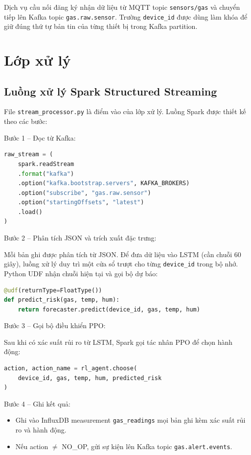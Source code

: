 Dịch vụ cầu nối đăng ký nhận dữ liệu từ MQTT topic \texttt{sensors/gas} và chuyển tiếp lên Kafka topic \texttt{gas.raw.sensor}. Trường \texttt{device\_id} được dùng làm khóa để giữ đúng thứ tự bản tin của từng thiết bị trong Kafka partition.

\section{Lớp xử lý}

\subsection{Luồng xử lý Spark Structured Streaming}

File \texttt{stream\_processor.py} là điểm vào của lớp xử lý. Luồng Spark được thiết kế theo các bước:

Bước 1 – Đọc từ Kafka:
\begin{lstlisting}[language=Python, caption={Đọc luồng dữ liệu từ Kafka}]
raw_stream = (
    spark.readStream
    .format("kafka")
    .option("kafka.bootstrap.servers", KAFKA_BROKERS)
    .option("subscribe", "gas.raw.sensor")
    .option("startingOffsets", "latest")
    .load()
)
\end{lstlisting}

Bước 2 – Phân tích JSON và trích xuất đặc trưng:

Mỗi bản ghi được phân tích từ JSON. Để đưa dữ liệu vào LSTM (cần chuỗi 60 giây), luồng xử lý duy trì một cửa sổ trượt cho từng \texttt{device\_id} trong bộ nhớ. Python UDF nhận chuỗi hiện tại và gọi bộ dự báo:

\begin{lstlisting}[language=Python, caption={Gọi bộ dự báo LSTM trong Spark}]
@udf(returnType=FloatType())
def predict_risk(gas, temp, hum):
    return forecaster.predict(device_id, gas, temp, hum)
\end{lstlisting}

Bước 3 – Gọi bộ điều khiển PPO:

Sau khi có xác suất rủi ro từ LSTM, Spark gọi tác nhân PPO để chọn hành động:

\begin{lstlisting}[language=Python, caption={Gọi tác nhân PPO}]
action, action_name = rl_agent.choose(
    device_id, gas, temp, hum, predicted_risk
)
\end{lstlisting}

Bước 4 – Ghi kết quả:
\begin{itemize}
  \item Ghi vào InfluxDB measurement \texttt{gas\_readings} mọi bản ghi kèm xác suất rủi ro và hành động.
  \item Nếu action $\neq$ NO\_OP, gửi sự kiện lên Kafka topic \texttt{gas.alert.events}.
\end{itemize}

